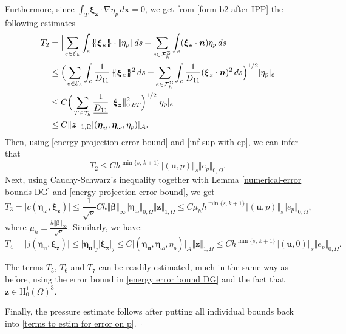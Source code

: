 \documentclass[reqno,a4paper]{article}
\numberwithin{equation}{section}
\newcommand\bu{\boldsymbol{u}}
\newcommand\bx{\boldsymbol{x}}
\newcommand\bz{\boldsymbol{z}}
\newcommand\bbbeta{\boldsymbol{\beta}}
\newcommand\cT{\mathcal{T}}
\newcommand\cE{{\mathcal{E}}}
\newcommand\cF{{\mathcal{F}}}
\renewcommand\O{\Omega}
\renewcommand\H{\mathrm{H}}
\newcommand\bn{\boldsymbol{n}}
\newcommand\bomega{\boldsymbol{\omega}}
\newcommand\bxi{\boldsymbol{\xi}}
\newcommand\betta{\boldsymbol{\eta}}
\newcommand{\jump}[1]{\left[\![#1\right]\!]}
\newcommand{\avg}[1]{\left\{\!\!\{#1\right\}\!\!\}}
\newenvironment{proof}{\noindent{\it Proof.}}{\hfill$\square$}
\begin{document}
\begin{proof}
Furthermore, since $\int_{T} \bxi_{\bz}\cdot \nabla \eta_p\, d\bx=0$, we get from \eqref{form b2 after IPP} the following 
estimates 
\begin{align*}
 T_2 & = \Big{\vert}\sum_{e\in\cE_{h}}\int_{e} \avg{\bxi_{\bz}}\cdot\jump{\eta_{p}}\,ds+\sum_{e\in\cF_h^{\Sigma} }\int_{e} (\bxi_{\bz}\cdot\bn)\eta_{p}\,ds\Big{\vert}\\
 &\leq  \Big(\sum_{e\in\cE_{h}}\int_{e}\frac{1}{D_{11}}\avg{\bxi_{\bz}}^{2}\,ds + \sum_{e\in\cF_h^{\Sigma}}\int_{e}\frac{1}{D_{11}}(\bxi_{\bz}\cdot\bn)^{2} \,ds \Big )^{1/2}\vert \eta_{p}\vert_e   \\
 &\leq  C\Big(\sum_{T\in\cT_h}\frac{1}{\underline{D_{11}}}\Vert\bxi_{\bz}\Vert_{0,\partial T}^{2} \Big )^{1/2}\vert \eta_{p}\vert_e \\&\leq C \Vert \bz\Vert_{1,\O}\vert(\betta_{\bu} ,\betta_{\bomega},\eta_p)\vert_{\mathcal{A}}. 
\end{align*}
Then, using \eqref{energy projection-error bound} and \eqref{inf sup with ep}, we can infer that 
\begin{equation*}
T_2\leq C h^{\min\{s,\,k+1\}}\Vert(\bu,p)\Vert_{s}\Vert e_p\Vert_{0,\O}.
\end{equation*}
%
Next, using Cauchy-Schwarz's inequality together with Lemma \ref{numerical-error bounds DG}
and \eqref{energy projection-error bound}, we get
$$
  T_3=\vert c(\betta_{\bomega}, \bxi_{\bz})\vert \leq \frac{1}{\sqrt{\nu}}C
  h \Vert\bbbeta\Vert_{\infty}\Vert\betta_{\bomega}\Vert_{0,\O}\Vert\bz\Vert_{1,\O}
  \leq C\mu_{h} h^{\min\{s,k+1\}}\Vert(\bu,p)\Vert_{s}\Vert e_p\Vert_{0,\O},
$$
where $\mu_{h}=\frac{h\Vert\bbbeta\Vert_{\infty}}{\sqrt{\nu}}$.
Similarly, we have:
\begin{equation*}
  T_4=\vert j(\betta_{\bu},\bxi_{\bz})\vert \leq \vert\betta_{\bu} \vert_{j} \vert\bxi_{\bz} \vert_{j}\leq C \vert(\betta_{\bu},\betta_{\bomega},\eta_{p})\vert_{\mathcal{A}}\Vert\bz\Vert_{1,\O}
\leq  C h^{\min\{s,\,k+1\}}\Vert(\bu,0)\Vert_{s}\Vert e_p\Vert_{0,\O}.
\end{equation*}

The terms $T_5$, $T_6$ and $T_7$ can be readily estimated, much in the same way as before, 
 using the error bound in \eqref{energy error bound DG} and the fact that $\bz\in \H^{1}_{0}(\O)^3$.

Finally, the pressure estimate follows after putting all individual bounds back into \eqref{terms to estim for error on p}.
\end{proof}
\end{document}
